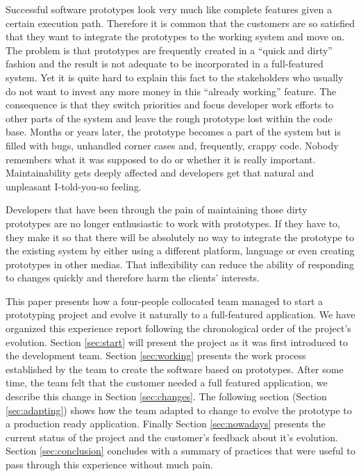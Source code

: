 \documentclass[lnbip]{svmultln}
\begin{document}
Successful software prototypes look very much like complete features
given a certain execution path. Therefore it is common that the
customers are so satisfied that they want to integrate the
prototypes to the working system and move on. The problem is that
prototypes are frequently created in a ``quick and dirty'' fashion and
the result is not adequate to be incorporated in a full-featured
system. Yet it is quite hard to explain this fact to the stakeholders
who usually do not want to invest any more money in this ``already
working'' feature. The consequence is that they switch priorities and
 focus developer work efforts to other parts of the system and leave the rough
prototype lost within the code base. Months or years later, the
prototype becomes a part of the system but is filled with bugs,
unhandled corner cases and, frequently, crappy code. Nobody remembers
what it was supposed to do or whether it is really
important. Maintainability gets deeply affected and developers get
that natural and unpleasant I-told-you-so feeling. %

Developers that have been through the pain of maintaining those dirty
prototypes are no longer enthusiastic to work with prototypes. If
they have to, they make it so that there will be absolutely no way to
integrate the prototype to the existing system by either using a
different platform, language or even creating prototypes in other
medias. That inflexibility can reduce the ability of responding to
changes quickly and therefore harm the clients' interests.

This paper presents how a four-people collocated team managed to start
a prototyping project and evolve it naturally to a full-featured
application. We have organized this experience report following the chronological order
of the project's evolution. Section \ref{sec:start} will present the
project as it was first introduced to the development team. Section
\ref{sec:working} presents the work process established by the team to
create the software based on prototypes.  After some time, the team
felt that the customer needed a full featured application, we describe this change in
 Section \ref{sec:changes}. The following section (Section
\ref{sec:adapting}) shows how the team adapted to change to
evolve the prototype to a production ready application. Finally Section \ref{sec:nowadays} presents the
current status of the project and the customer's feedback about it's evolution. Section \ref{sec:conclusion}
concludes with a summary of practices that were useful to pass through
this experience without much pain.
\end{document}
